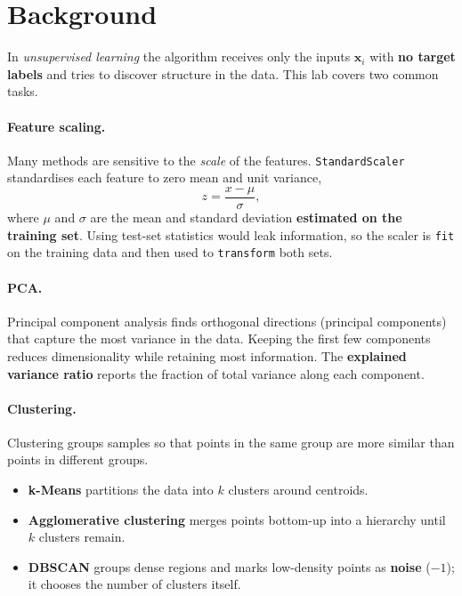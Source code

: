 \documentclass[11pt,a4paper]{article}
\begin{document}
\section{Background}
In \emph{unsupervised learning} the algorithm receives only the inputs
$\mathbf{x}_i$ with \textbf{no target labels} and tries to discover structure in
the data. This lab covers two common tasks.

\paragraph{Feature scaling.} Many methods are sensitive to the \emph{scale} of
the features. \lstinline|StandardScaler| standardises each feature to zero mean
and unit variance,
\[
  z = \frac{x - \mu}{\sigma},
\]
where $\mu$ and $\sigma$ are the mean and standard deviation \textbf{estimated
on the training set}. Using test-set statistics would leak information, so the
scaler is \lstinline|fit| on the training data and then used to
\lstinline|transform| both sets.

\paragraph{PCA.} Principal component analysis finds orthogonal directions
(principal components) that capture the most variance in the data. Keeping the
first few components reduces dimensionality while retaining most information. The
\textbf{explained variance ratio} reports the fraction of total variance along
each component.

\paragraph{Clustering.} Clustering groups samples so that points in the same
group are more similar than points in different groups.
\begin{itemize}[leftmargin=*]
  \item \textbf{k-Means} partitions the data into $k$ clusters around centroids.
  \item \textbf{Agglomerative clustering} merges points bottom-up into a
        hierarchy until $k$ clusters remain.
  \item \textbf{DBSCAN} groups dense regions and marks low-density points as
        \textbf{noise} ($-1$); it chooses the number of clusters itself.
\end{itemize}
\end{document}
